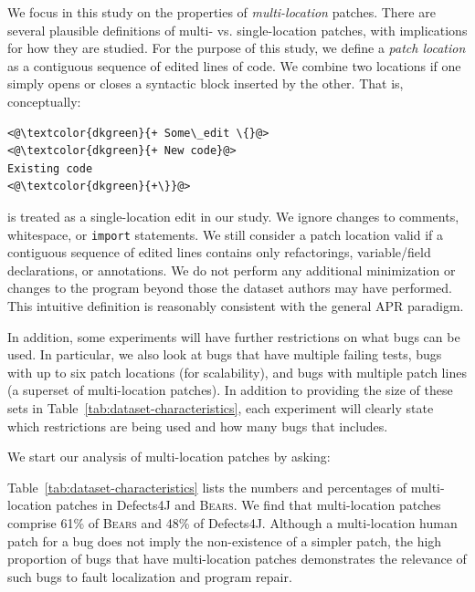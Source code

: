 \documentclass[10pt, conference]{IEEEtran}
\newcommand\bears{\textsc{Bears}\xspace}
\begin{document}
We focus in this study on the properties of \emph{multi-location} patches. There are
several plausible definitions of multi- vs. single-location patches, with
implications for how they are studied. For the purpose of this study, we define
a \emph{patch location} as a contiguous sequence of edited lines of code.  We
combine two locations if one simply opens or closes a syntactic block inserted
by the other. That is, conceptually:
\begin{lstlisting}[style=examplestyle]
<@\textcolor{dkgreen}{+ Some\_edit \{}@>
<@\textcolor{dkgreen}{+ New code}@>
Existing code
<@\textcolor{dkgreen}{+\}}@>
\end{lstlisting}
is treated as a single-location edit in our study. We ignore changes to
comments, whitespace, or \texttt{import} statements.
We still consider a patch location valid if a contiguous sequence of edited lines contains 
only refactorings, variable/field declarations, or annotations. We do not perform any 
additional minimization or changes to the program beyond those the dataset authors may 
have performed.
This intuitive definition is reasonably consistent with the general APR
paradigm. 

In addition, some experiments will have further restrictions on what bugs can be used. In 
particular, we also look at bugs that have multiple failing tests, bugs with up to six patch 
locations (for scalability), and bugs with multiple patch lines (a superset of multi-location 
patches). In addition to providing the size of these sets in 
Table~\ref{tab:dataset-characteristics}, each experiment will clearly state which restrictions are 
being used and how many bugs that includes.

We start our analysis of multi-location patches by asking:


Table~\ref{tab:dataset-characteristics} lists the numbers and percentages of
multi-location patches in Defects4J and \bears. 
We find that multi-location patches comprise 61\% of \bears and 48\% of 
Defects4J.
Although a multi-location human patch for a bug does not imply the 
non-existence of a simpler patch, the high proportion of bugs that have 
multi-location patches demonstrates the relevance of such bugs to fault localization and
program repair. 
\end{document}
